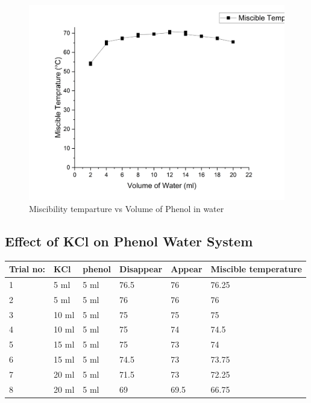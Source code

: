 \documentclass{report}
\begin{document}
\begin{figure}[H]
    \centering
    \includegraphics[width = 15cm]{cst-pheonl-water.png}
    \caption{Miscibility temparture vs Volume of Phenol in water}
\end{figure}

\subsection*{Effect of KCl on Phenol Water System}
\begin{table}[H]
\begin{tabular}{|l|l|l|l|l|l|}
\hline
Trial no: & KCl   & phenol & Disappear & Appear & Miscible temperature  \\ \hline
1         & 5 ml  & 5 ml   & 76.5      & 76     & 76.25 \\ \hline
2         & 5 ml  & 5 ml   & 76        & 76     & 76    \\ \hline
3         & 10 ml & 5 ml   & 75        & 75     & 75    \\ \hline
4         & 10 ml & 5 ml   & 75        & 74     & 74.5  \\ \hline
5         & 15 ml & 5 ml   & 75        & 73     & 74    \\ \hline
6         & 15 ml & 5 ml   & 74.5      & 73     & 73.75 \\ \hline
7         & 20 ml & 5 ml   & 71.5      & 73     & 72.25 \\ \hline
8         & 20 ml & 5 ml   & 69        & 69.5   & 66.75 \\ \hline
\end{tabular}
\end{table}
\end{document}
